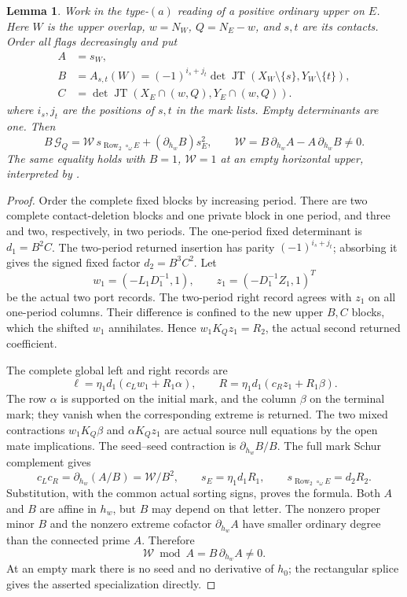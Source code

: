 \documentclass[11pt,a4paper]{amsart}
\numberwithin{equation}{section}
\theoremstyle{plain}
\newtheorem{lemma}[theorem]{Lemma}
\theoremstyle{definition}
\newcommand{\Row}{\operatorname{Row}}
\newcommand{\JT}{\operatorname{JT}}
\begin{document}
\begin{lemma}\label{ph:ordinary-activation}
Work in the type-\((a)\) reading of a positive ordinary upper on \(E\).
Here \(W\) is the upper overlap, \(w=N_W\), \(Q=N_E-w\), and \(s,t\)
are its contacts.  Order all flags decreasingly and put
\[
 \begin{aligned}
 A&=s_W,\\
 B&=A_{s,t}(W)
   =(-1)^{i_s+j_t}
      \det\JT(X_W\setminus\{s\},Y_W\setminus\{t\}),\\
 C&=\det\JT(X_E\cap(w,Q),Y_E\cap(w,Q)).
 \end{aligned}
\]
where \(i_s,j_t\) are the positions of \(s,t\) in the mark lists.
Empty determinants are one.  Then
\[
 B\,\mathcal G_Q
 =\mathcal W\,s_{\Row_2\circ_\omega E}
       +(\partial_{h_w}B)s_E^2,\qquad
 \mathcal W=B\,\partial_{h_w}A-A\,\partial_{h_w}B\ne0.
\]
The same equality holds with \(B=1\), \(\mathcal W=1\) at an empty
horizontal upper, interpreted by .
\end{lemma}
\begin{proof}
Order the complete fixed blocks by increasing period.
There are two complete contact-deletion blocks and one private block
in one period, and three and two, respectively, in two periods.
The one-period fixed determinant is \(d_1=B^2C\).
The two-period returned insertion has parity
\((-1)^{i_s+j_t}\); absorbing it gives the signed fixed factor
\(d_2=B^3C^2\).  Let
\[
 w_1=(-L_1D_1^{-1},1),\qquad z_1=(-D_1^{-1}Z_1,1)^T
\]
be the actual two port records.  The two-period right record agrees with
\(z_1\) on all one-period columns.  Their difference is confined to the
new upper \(B,C\) blocks, which the shifted \(w_1\) annihilates.  Hence
\(w_1K_Qz_1=R_2\), the actual second returned coefficient.

The complete global left and right records are
\[
 \ell=\eta_1d_1(c_Lw_1+R_1\alpha),\qquad
 R=\eta_1d_1(c_Rz_1+R_1\beta).
\]
The row \(\alpha\) is supported on the initial mark, and the column
\(\beta\) on the terminal mark; they vanish when the corresponding
extreme is returned.  The two mixed contractions
\(w_1K_Q\beta\) and \(\alpha K_Qz_1\) are actual source null equations
by the open mate implications.  The seed--seed contraction is
\(\partial_{h_w}B/B\).  The full mark Schur complement gives
\[
 c_Lc_R=\partial_{h_w}(A/B)=\mathcal W/B^2,
 \qquad s_E=\eta_1d_1R_1,\qquad
 s_{\Row_2\circ_\omega E}=d_2R_2.
\]
Substitution, with the common actual sorting signs, proves the formula.
Both \(A\) and \(B\) are affine in \(h_w\), but \(B\) may depend
on that letter.  The nonzero proper minor \(B\) and the nonzero
extreme cofactor \(\partial_{h_w}A\) have smaller ordinary degree
than the connected prime \(A\).  Therefore
\[
 \mathcal W\bmod A=B\,\partial_{h_w}A\ne0.
\]
At an empty mark there is no seed and no derivative of \(h_0\);
the rectangular splice gives the asserted specialization directly.
\end{proof}
\end{document}

